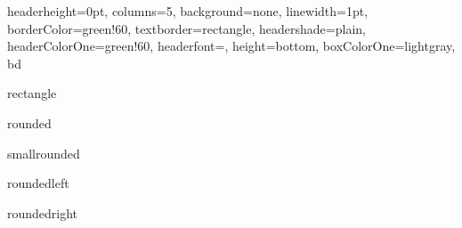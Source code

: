 \documentclass[portrait,fontscale=1,margin=0.2cm,paperwidth=15truecm, paperheight=1.5cm,debug]{baposter}
\begin{document}
\begin{poster}{
  headerheight=0pt,
  columns=5,
  background=none,
  linewidth=1pt,
  borderColor=green!60,
  textborder=rectangle,
  headershade=plain,
  headerColorOne=green!60,
  headerfont={},
  height=bottom,
  boxColorOne=lightgray,
}{}{b}{}{d}

\begin{posterbox}[column=0,headerfont={},headershape=rectangle]{rectangle}
\end{posterbox}

\begin{posterbox}[column=1,headerfont={},headershape=rounded]{rounded}
\end{posterbox}

\begin{posterbox}[column=2,headerfont={},headershape=smallrounded]{smallrounded}
\end{posterbox}

\begin{posterbox}[column=3,headerfont={},headershape=roundedleft]{roundedleft}
\end{posterbox}

\begin{posterbox}[column=4,headerfont={},headershape=roundedright]{roundedright}
\end{posterbox}

\end{poster}
\end{document}
